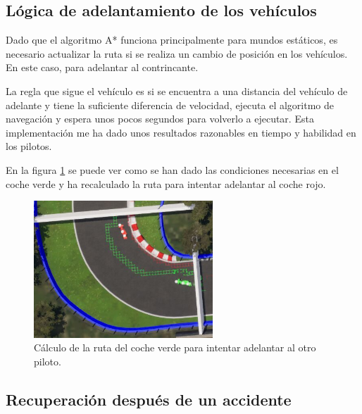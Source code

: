 \newpage

\subsection{Lógica de adelantamiento de los vehículos}


Dado que el algoritmo A* funciona principalmente para mundos estáticos, es necesario actualizar la ruta si se realiza un cambio de posición en los vehículos. En este caso, para adelantar al contrincante.

\bigskip

La regla que sigue el vehículo es si se encuentra a una distancia del vehículo de adelante y tiene la suficiente diferencia de velocidad, ejecuta el algoritmo de navegación y espera unos pocos segundos para volverlo a ejecutar. Esta implementación me ha dado unos resultados razonables en tiempo y habilidad en los pilotos.

\bigskip

En la figura \ref{fig:overtake} se puede ver como se han dado las condiciones necesarias en el coche verde y ha recalculado la ruta para intentar adelantar al coche rojo.

\begin{figure}[H]
    \centering
    \includegraphics[width=0.6\textwidth]{imagenes/converted/overtake.jpg}
    \caption{Cálculo de la ruta del coche verde para intentar adelantar al otro piloto.}
    \label{fig:overtake}
\end{figure}

\subsection{Recuperación después de un accidente}

